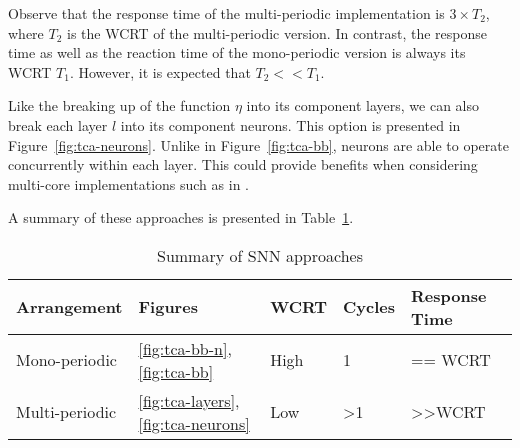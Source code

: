 Observe that the response time of the multi-periodic implementation is
$3 \times T_2$, where $T_2$ is the \ac{WCRT} of the multi-periodic
version. In contrast, the response time as well as the reaction time
of the mono-periodic version is always its \ac{WCRT} $T_1$. However, it is
expected that $T_2 << T_1$.

Like the breaking up of the function $\eta$ into its component
layers, we can also break each layer $l$ into its component neurons.
This option is presented in Figure~\ref{fig:tca-neurons}. 
Unlike in Figure~\ref{fig:tca-bb}, neurons are able to operate concurrently within each layer. 
This could provide benefits when considering multi-core
implementations such as in \cite{yuan2011compiling}.

A summary of these approaches is presented in Table~\ref{tbl:sann-approaches}.
\begin{table}[H]
	\centering
	\caption{Summary of \ac{SNN} approaches}
	\label{tbl:sann-approaches}
	\begin{tabular}{|l|l|l|l|l|}
		\hline
		Arrangement    & Figures & WCRT & Cycles & Response Time   \\ \hline
		Mono-periodic  & \ref{fig:tca-bb-n},\ref{fig:tca-bb} & High & 1 & == WCRT              \\
		Multi-periodic & \ref{fig:tca-layers},\ref{fig:tca-neurons}& Low  & \textgreater{}1 & \textgreater{}\textgreater{}WCRT \\ \hline
	\end{tabular}
\end{table}



